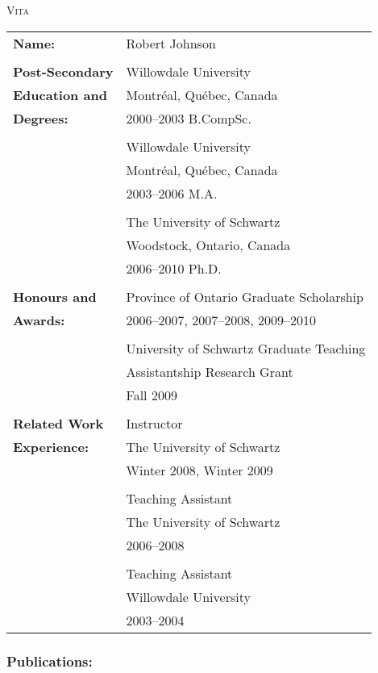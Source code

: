 \begin{center}\textsc{Vita}\end{center}

\begin{table}[ht]
\begin{tabular}{ll}
\textbf{Name:} & Robert Johnson \\\\
\textbf{Post-Secondary} & Willowdale University\\
\textbf{Education and}& Montr\'eal, Qu\'ebec, Canada\\
\textbf{Degrees:}& 2000--2003 B.CompSc.\\\\
& Willowdale University\\
& Montr\'eal, Qu\'ebec, Canada\\
& 2003--2006 M.A.\\\\
& The University of Schwartz\\
& Woodstock, Ontario, Canada\\
& 2006--2010 Ph.D.\\\\
\textbf{Honours and}& Province of Ontario Graduate Scholarship\\
\textbf{Awards:}& 2006--2007, 2007--2008, 2009--2010\\\\
& University of Schwartz Graduate Teaching\\
& Assistantship Research Grant \\
& Fall 2009\\\\
\textbf{Related Work}& Instructor\\
\textbf{Experience:}& The University of Schwartz\\
& Winter 2008, Winter 2009\\\\
& Teaching Assistant\\
& The University of Schwartz\\
& 2006--2008\\\\
& Teaching Assistant\\
& Willowdale University\\
& 2003--2004
\end{tabular}
\end{table}

\subsubsection*{Publications:}

